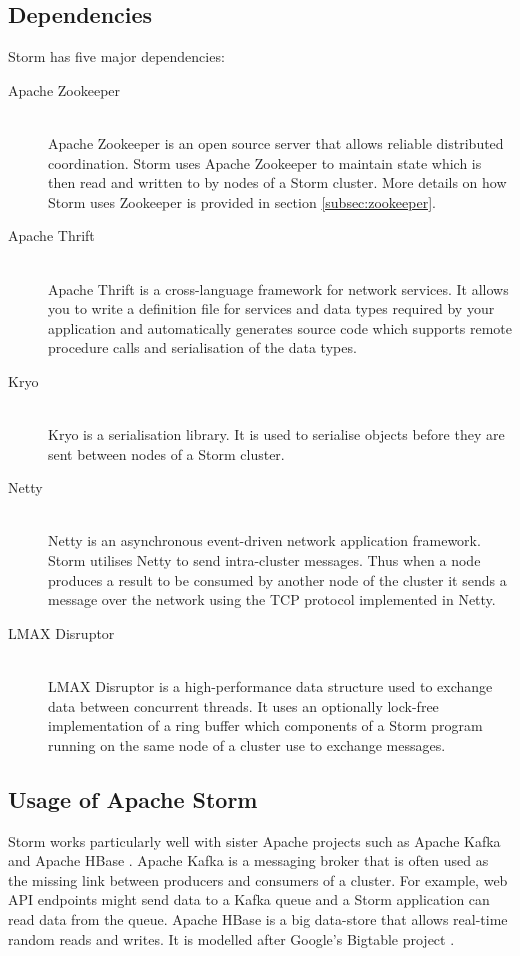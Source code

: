 \subsection{Dependencies}

Storm has five major dependencies:

\begin{description}
	\item[Apache Zookeeper] \hfill \\
	Apache Zookeeper \citep{ApacheZookeeper} is an open source server that allows reliable distributed coordination. Storm uses Apache Zookeeper to maintain state which is then read and written to by nodes of a Storm cluster. More details on how Storm uses Zookeeper is provided in section \ref{subsec:zookeeper}.
	\item[Apache Thrift] \hfill \\
	Apache Thrift \citep{ApacheThrift} is a cross-language framework for network services. It allows you to write a definition file for services and data types required by your application and automatically generates source code which supports remote procedure calls and serialisation of the data types.
	\item[Kryo] \hfill \\
	Kryo \citep{EsotericKryo} is a serialisation library. It is used to serialise objects before they are sent between nodes of a Storm cluster.
	\item[Netty] \hfill \\
	Netty \citep{Netty} is an asynchronous event-driven network application framework. Storm utilises Netty to send intra-cluster messages. Thus when a node produces a result to be consumed by another node of the cluster it sends a message over the network using the TCP protocol implemented in Netty.
	\item[LMAX Disruptor] \hfill \\
	LMAX Disruptor \cite{LMAXDisruptor} is a high-performance data structure used to exchange data between concurrent threads. It uses an optionally lock-free implementation of a ring buffer which components of a Storm program running on the same node of a cluster use to exchange messages.
\end{description}

\subsection{Usage of Apache Storm}

Storm works particularly well with sister Apache projects such as Apache Kafka \cite{ApacheKafka} and Apache HBase \cite{ApacheHBase}. Apache Kafka is a messaging broker that is often used as the missing link between producers and consumers of a cluster. For example, web API endpoints might send data to a Kafka queue and a Storm application can read data from the queue. Apache HBase is a big data-store that allows real-time random reads and writes. It is modelled after Google's Bigtable project \cite{Chang:2008:BDS:1365815.1365816}.

